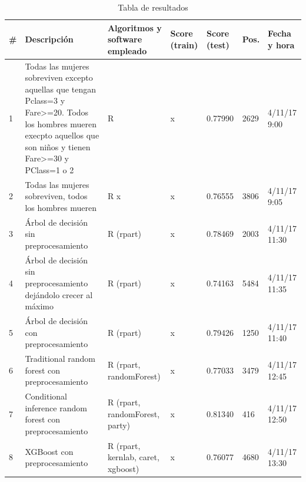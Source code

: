 \begin{table}[H]
	\centering
	\caption{Tabla de resultados}
	\label{tab:results}
	\begin{tabular}{|l|p{5.1cm}p{1.8cm}p{1.2cm}p{1.2cm}p{0.6cm}p{1.5cm}|}
		\hline
		\# & Descripción & Algoritmos y software empleado & Score (train) & Score (test) & Pos. & Fecha y hora \\ \hline \hline
		1  & Todas las mujeres sobreviven excepto aquellas que tengan Pclass=3 y Fare\textgreater=20. Todos los hombres mueren execpto aquellos que son niños y tienen Fare\textgreater=30 y PClass=1 o 2 & R & x & 0.77990 & 2629 & 4/11/17 9:00 \\ \hline
		2  & Todas las mujeres sobreviven, todos los hombres mueren & R x & x & 0.76555 & 3806 & 4/11/17 9:05 \\ \hline
		3  & Árbol de decisión sin preprocesamiento & R (rpart) & x & 0.78469 & 2003 & 4/11/17 11:30 \\ \hline
		4  & Árbol de decisión sin preprocesamiento dejándolo crecer al máximo & R (rpart) & x & 0.74163 & 5484 & 4/11/17 11:35 \\ \hline
		5  & Árbol de decisión con preprocesamiento & R (rpart) & x & 0.79426 & 1250 & 4/11/17 11:40 \\ \hline
		6  & Traditional random forest con preprocesamiento & R (rpart, randomForest) & x & 0.77033 & 3479 & 4/11/17 12:45 \\ \hline
		7  & Conditional inference random forest con preprocesamiento & R (rpart, randomForest, party) & x & 0.81340 & 416 & 4/11/17 12:50 \\ \hline
		8  & XGBoost con preprocesamiento & R (rpart, kernlab, caret, xgboost) & x & 0.76077 & 4680 & 4/11/17 13:30 \\ \hline       
	\end{tabular}
\end{table}


\newpage


